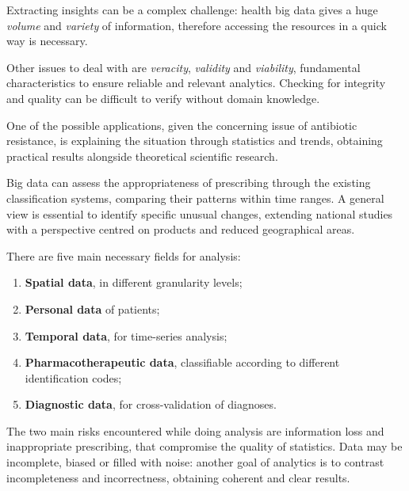 Extracting insights can be a complex challenge: health big data gives a huge \textit{volume} and \textit{variety} of information, therefore accessing the resources in a quick way is necessary. 

Other issues to deal with are \textit{veracity}, \textit{validity} and \textit{viability}, fundamental characteristics to ensure reliable and relevant analytics. Checking for integrity and quality can be difficult to verify without domain knowledge\cite{4vs}.

One of the possible applications, given the concerning issue of antibiotic resistance, is explaining the situation through statistics and trends, obtaining practical results alongside theoretical scientific research. 

Big data can assess the appropriateness of prescribing through the existing classification systems, comparing their patterns within time ranges. A general view is essential to identify specific unusual changes, extending national studies with a perspective centred on products and reduced geographical areas.

There are five main necessary fields for analysis\cite{DC}:
\begin{enumerate}
	\item \textbf{Spatial data}, in different granularity levels;
	\item \textbf{Personal data} of patients;
	\item \textbf{Temporal data}, for time-series analysis;
	\item \textbf{Pharmacotherapeutic data}, classifiable according to different identification codes;
	\item \textbf{Diagnostic data}, for cross-validation of diagnoses.
\end{enumerate}

The two main risks encountered while doing analysis are information loss and inappropriate prescribing, that compromise the quality of statistics. Data may be incomplete, biased or filled with noise: another goal of analytics is to contrast incompleteness and incorrectness, obtaining coherent and clear results.
